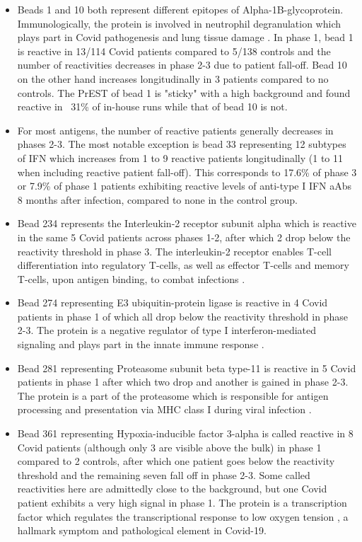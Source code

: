 \documentclass{article}
\begin{document}
\begin{itemize}
    \item Beads 1 and 10 both represent different epitopes of Alpha-1B-glycoprotein. Immunologically, the protein is involved in neutrophil degranulation which plays part in Covid pathogenesis and lung tissue damage \cite{neutrophil_damage}. In phase 1, bead 1 is reactive in 13/114 Covid patients compared to 5/138 controls and the number of reactivities decreases in phase 2-3 due to patient fall-off. Bead 10 on the other hand increases longitudinally in 3 patients compared to no controls. The PrEST of bead 1 is "sticky" with a high background and found reactive in ~31\% of in-house runs while that of bead 10 is not. 
    
    \item For most antigens, the number of reactive patients generally decreases in phases 2-3. The most notable exception is bead 33 representing 12 subtypes of IFN\textalpha{} which increases from 1 to 9 reactive patients longitudinally (1 to 11 when including reactive patient fall-off). This corresponds to 17.6\% of phase 3 or 7.9\% of phase 1 patients exhibiting reactive levels of anti-type I IFN aAbs 8 months after infection, compared to none in the control group. 
    
    \item Bead 234 represents the Interleukin-2 receptor subunit alpha which is reactive in the same 5 Covid patients across phases 1-2, after which 2 drop below the reactivity threshold in phase 3. The interleukin-2 receptor enables T-cell differentiation into regulatory T-cells, as well as effector T-cells and memory T-cells, upon antigen binding, to combat infections \cite{il2ra}.
    
    \item Bead 274 representing E3 ubiquitin-protein ligase is reactive in 4 Covid patients in phase 1 of which all drop below the reactivity threshold in phase 2-3. The protein is a negative regulator of type I interferon-mediated signaling and plays part in the innate immune response \cite{GO}.
    
    \item Bead 281 representing Proteasome subunit beta type-11 is reactive in 5 Covid patients in phase 1 after which two drop and another is gained in phase 2-3. The protein is a part of the proteasome which is responsible for antigen processing and presentation via MHC class I during viral infection \cite{GO}.
    
    \item Bead 361 representing Hypoxia-inducible factor 3-alpha is called reactive in 8 Covid patients (although only 3 are visible above the bulk) in phase 1 compared to 2 controls, after which one patient goes below the reactivity threshold and the remaining seven fall off in phase 2-3. Some called reactivities here are admittedly close to the background, but one Covid patient exhibits a very high signal in phase 1. The protein is a transcription factor which regulates the transcriptional response to low oxygen tension \cite{hif}, a hallmark symptom and pathological element in Covid-19.
    

\end{itemize}
\end{document}
